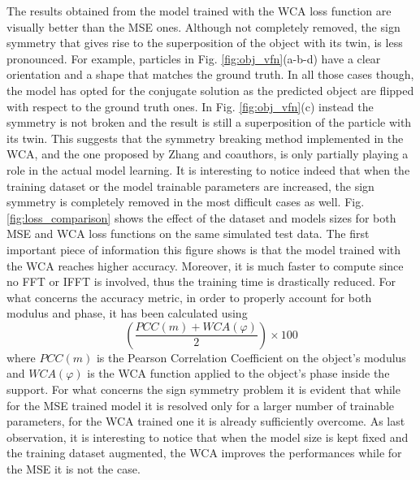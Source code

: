 The results obtained from the model trained with the WCA loss function are visually better than the MSE ones. Although not 
completely removed, the sign symmetry that gives rise to the superposition of the object with its twin, is less pronounced. 
For example, particles in Fig. \ref{fig:obj_vfn}(a-b-d) have a clear orientation and a shape that matches the ground truth. 
In all those cases though, the model has opted for the conjugate solution as the predicted object are flipped with respect to 
the ground truth ones. In Fig. \ref{fig:obj_vfn}(c) instead the symmetry is not broken and the result is still a superposition 
of the particle with its twin. This suggests that the symmetry breaking method implemented in the WCA, and the one proposed by 
Zhang and coauthors, is only partially playing a role in the actual model learning. It is interesting to notice indeed that 
when the training dataset or the model trainable parameters are increased, the sign symmetry is completely removed in the most 
difficult cases as well. Fig. \ref{fig:loss_comparison} shows the effect of the dataset and models sizes for both MSE and WCA 
loss functions on the same simulated test data. The first important piece of information this figure shows is that the model trained 
with the WCA reaches higher accuracy. Moreover, it is much faster to compute since no FFT or IFFT is involved, thus the training time 
is drastically reduced. For what concerns the accuracy metric, in order to properly account for both modulus and phase, 
it has been calculated using 
\begin{equation}
 \left(\frac{PCC(m) + WCA(\varphi)}{2}\right)\times 100
\end{equation}
where $PCC(m)$ is the Pearson Correlation Coefficient on the object's modulus and $WCA(\varphi)$ is the WCA function 
applied to the object's phase inside the support. For what concerns the sign symmetry problem it is evident that while for 
the MSE trained model it is resolved only for a larger number of trainable parameters, for the WCA trained one it is already 
sufficiently overcome. As last observation, it is interesting to notice that when the model size is kept fixed and the training 
dataset augmented, the WCA improves the performances while for the MSE it is not the case. 

